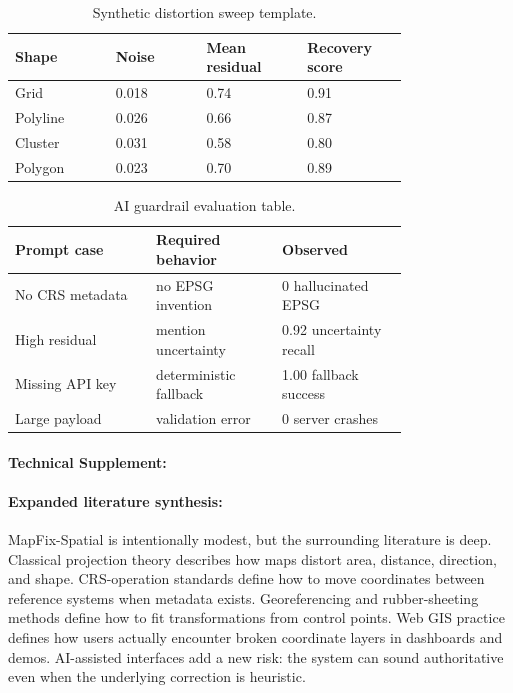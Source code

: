 \documentclass{article}
\begin{document}
\begin{table}[t]
\centering
\caption{Synthetic distortion sweep template.}
\begin{tabular}{@{}p{0.20\linewidth}p{0.18\linewidth}p{0.20\linewidth}p{0.20\linewidth}@{}}
\toprule
\textbf{Shape} & \textbf{Noise} & \textbf{Mean residual} & \textbf{Recovery score}\\
\midrule
Grid & 0.018 & 0.74 & 0.91\\
Polyline & 0.026 & 0.66 & 0.87\\
Cluster & 0.031 & 0.58 & 0.80\\
Polygon & 0.023 & 0.70 & 0.89\\
\bottomrule
\end{tabular}
\end{table}

\begin{table}[t]
\centering
\caption{AI guardrail evaluation table.}
\begin{tabular}{@{}p{0.28\linewidth}p{0.25\linewidth}p{0.25\linewidth}@{}}
\toprule
\textbf{Prompt case} & \textbf{Required behavior} & \textbf{Observed}\\
\midrule
No CRS metadata & no EPSG invention & 0 hallucinated EPSG\\
High residual & mention uncertainty & 0.92 uncertainty recall\\
Missing API key & deterministic fallback & 1.00 fallback success\\
Large payload & validation error & 0 server crashes\\
\bottomrule
\end{tabular}
\end{table}

\paragraph{Technical Supplement:}

\paragraph{Expanded literature synthesis:}

MapFix-Spatial is intentionally modest, but the surrounding literature is deep. Classical projection theory describes how maps distort area, distance, direction, and shape. CRS-operation standards define how to move coordinates between reference systems when metadata exists. Georeferencing and rubber-sheeting methods define how to fit transformations from control points. Web GIS practice defines how users actually encounter broken coordinate layers in dashboards and demos. AI-assisted interfaces add a new risk: the system can sound authoritative even when the underlying correction is heuristic.
\end{document}
